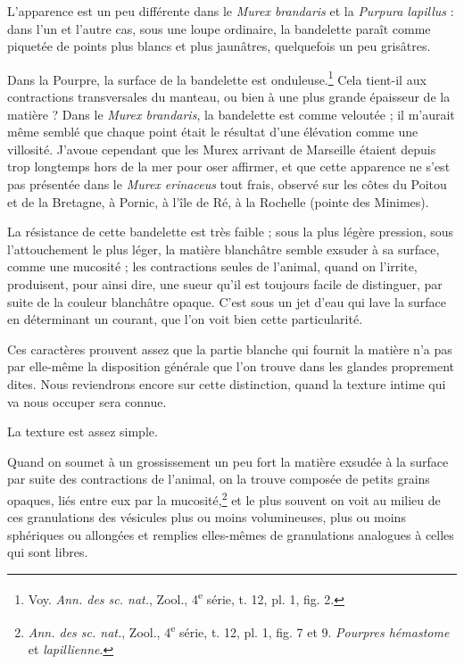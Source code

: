 \documentclass[a4paper, 11pt, oneside, polutonikogreek, french]{article}
\begin{document}
L'apparence est un peu différente dans le \emph{Murex brandaris} et la \emph{Purpura lapillus} : dans l'un et l'autre cas, sous une loupe ordinaire, la bandelette paraît comme piquetée de points plus blancs et plus jaunâtres, quelquefois un peu grisâtres.

Dans la Pourpre, la surface de la bandelette est onduleuse.\footnote{Voy. \emph{Ann. des sc. nat.}, Zool., 4\textsuperscript{e} série, t. 12, pl. 1, fig. 2.} Cela tient-il aux contractions transversales du manteau, ou bien à une plus grande épaisseur de la matière ? Dans le \emph{Murex brandaris}, la bandelette est comme veloutée ; il m'aurait même semblé que chaque point était le résultat d'une élévation comme une villosité. J'avoue cependant que les Murex arrivant de Marseille étaient depuis trop longtemps hors de la mer pour oser affirmer, et que cette apparence ne s'est pas présentée dans le \emph{Murex erinaceus} tout frais, observé sur les côtes du Poitou et de la Bretagne, à Pornic, à l'île de Ré, à la Rochelle (pointe des Minimes).

La résistance de cette bandelette est très faible ; sous la plus légère pression, sous l'attouchement le plus léger, la matière blanchâtre semble exsuder à sa surface, comme une mucosité ; les contractions seules de l'animal, quand on l'irrite, produisent, pour ainsi dire, une sueur qu'il est toujours facile de distinguer, par suite de la couleur blanchâtre opaque. C'est sous un jet d'eau qui lave la surface en déterminant un courant, que l'on voit bien cette particularité.

Ces caractères prouvent assez que la partie blanche qui fournit la matière n'a pas par elle-même la disposition générale que l'on trouve dans les glandes proprement dites. Nous reviendrons encore sur cette distinction, quand la texture intime qui va nous occuper sera connue.

La texture est assez simple.

Quand on soumet à un grossissement un peu fort la matière exsudée à la surface par suite des contractions de l'animal, on la trouve composée de petits grains opaques, liés entre eux par la mucosité,\footnote{\emph{Ann. des sc. nat.}, Zool., 4\textsuperscript{e} série, t. 12, pl. 1, fig. 7 et 9. \emph{Pourpres hémastome} et \emph{lapillienne}.} et le plus souvent on voit au milieu de ces granulations des vésicules plus ou moins volumineuses, plus ou moins sphériques ou allongées et remplies elles-mêmes de granulations analogues à celles qui sont libres.
\end{document}
